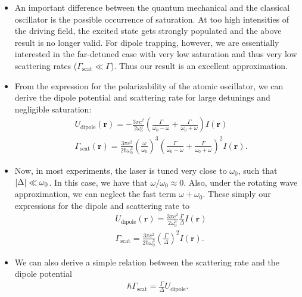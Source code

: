 \documentclass{book}
\theoremstyle{definition}
\newcommand{\f}[2]{\frac{#1}{#2}}
\newcommand{\lp}{\left(}
\newcommand{\rp}{\right)}
\begin{document}
\begin{itemize}
\begin{itemize}
		\item An important difference between the quantum mechanical and the classical oscillator is the possible occurrence of saturation. At too high intensities of the driving field, the excited state gets strongly populated and the above result is no longer valid. For dipole trapping, however, we are essentially interested in the far-detuned case with very low saturation and thus very
		low scattering rates ($\Gamma_\text{scat} \ll \Gamma$). Thus our result is an excellent approximation. 
		
		
		\item From the expression for the polarizability of the atomic oscillator, we can derive the dipole potential and scattering rate for large detunings and negligible saturation:
		\begin{align}
		&U_\text{dipole}(\mathbf{r}) = -\f{3\pi c^2}{2\omega_0^3}\lp \f{\Gamma}{\omega_0 - \omega} + \f{\Gamma}{\omega_0 + \omega}\rp I(\mathbf{r})\\
		&\Gamma_\text{scat}(\mathbf{r}) = \f{3\pi c^2}{2\hbar \omega_0^3}\lp \f{\omega}{\omega_0} \rp^3 \lp \f{\Gamma}{\omega_0 - \omega} + \f{\Gamma}{\omega_0 + \omega}\rp^2 I(\mathbf{r}).
		\end{align}
		
		
		
		\item Now, in most experiments, the laser is tuned very close to $\omega_0$, such that $\abs{\Delta} \ll \omega_0$. In this case, we have that $\omega/\omega_0 \approx 0$. Also, under the rotating wave approximation, we can neglect the fast term $\omega+ \omega_0$. These simply our expressions for the dipole and scattering rate to
		\begin{align}
		&U_\text{dipole}(\mathbf{r}) = \f{3\pi c^2}{2\omega_0^3}\f{\Gamma}{\Delta}I(\mathbf{r})\\
		&\Gamma_\text{scat} = \f{3\pi c^2}{2\hbar \omega_0^3}\lp \f{\Gamma}{\Delta} \rp^2I(\mathbf{r}).
		\end{align}
		
		\item We can also derive a simple relation between the scattering rate and the dipole potential
		\begin{align}
		\hbar \Gamma_\text{scat} = \f{\Gamma}{\Delta}U_\text{dipole}.
		\end{align}
		

\end{itemize}
\end{itemize}
\end{document}
